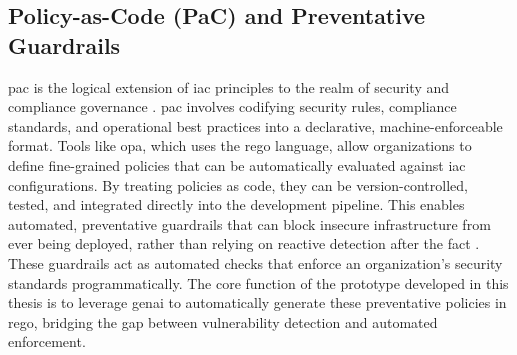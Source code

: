 \subsection{Policy-as-Code (PaC) and Preventative Guardrails}
\gls{pac} is the logical extension of \gls{iac} principles to the realm of security and compliance governance \cite{sarathe_krisshnan_jutoo_vijayaraghavan_policy_2025}. \gls{pac} involves codifying security rules, compliance standards, and operational best practices into a declarative, machine-enforceable format. Tools like \gls{opa}, which uses the \gls{rego} language, allow organizations to define fine-grained policies that can be automatically evaluated against \gls{iac} configurations. By treating policies as code, they can be version-controlled, tested, and integrated directly into the development pipeline. This enables automated, preventative guardrails that can block insecure infrastructure from ever being deployed, rather than relying on reactive detection after the fact \cite{amazon_web_services_aws_2024}. These guardrails act as automated checks that enforce an organization's security standards programmatically. The core function of the prototype developed in this thesis is to leverage \gls{genai} to automatically generate these preventative policies in \gls{rego}, bridging the gap between vulnerability detection and automated enforcement.


